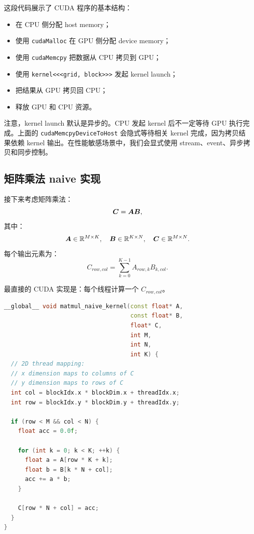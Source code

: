 这段代码展示了 CUDA 程序的基本结构：

\begin{itemize}
  \item 在 CPU 侧分配 host memory；
  \item 使用 \texttt{cudaMalloc} 在 GPU 侧分配 device memory；
  \item 使用 \texttt{cudaMemcpy} 把数据从 CPU 拷贝到 GPU；
  \item 使用 \texttt{kernel<<<grid, block>>>} 发起 kernel launch；
  \item 把结果从 GPU 拷贝回 CPU；
  \item 释放 GPU 和 CPU 资源。
\end{itemize}

注意，kernel launch 默认是异步的。CPU 发起 kernel 后不一定等待 GPU 执行完成。上面的 \texttt{cudaMemcpyDeviceToHost} 会隐式等待相关 kernel 完成，因为拷贝结果依赖 kernel 输出。在性能敏感场景中，我们会显式使用 stream、event、异步拷贝和同步控制。

\subsection{矩阵乘法 naive 实现}
\label{subsec:naive-matmul}

接下来考虑矩阵乘法：
\[
  \bm{C}=\bm{A}\bm{B},
\]
其中：
\[
  \bm{A}\in\mathbb{R}^{M\times K},
  \quad
  \bm{B}\in\mathbb{R}^{K\times N},
  \quad
  \bm{C}\in\mathbb{R}^{M\times N}.
\]
每个输出元素为：
\[
  C_{row,col}
  =
  \sum_{k=0}^{K-1}A_{row,k}B_{k,col}.
\]

最直接的 CUDA 实现是：每个线程计算一个 $C_{row,col}$。

\begin{lstlisting}[language=C++,caption={Naive CUDA 矩阵乘法 Kernel},label={lst:cuda-naive-matmul}]
__global__ void matmul_naive_kernel(const float* A,
                                    const float* B,
                                    float* C,
                                    int M,
                                    int N,
                                    int K) {
  // 2D thread mapping:
  // x dimension maps to columns of C
  // y dimension maps to rows of C
  int col = blockIdx.x * blockDim.x + threadIdx.x;
  int row = blockIdx.y * blockDim.y + threadIdx.y;

  if (row < M && col < N) {
    float acc = 0.0f;

    for (int k = 0; k < K; ++k) {
      float a = A[row * K + k];
      float b = B[k * N + col];
      acc += a * b;
    }

    C[row * N + col] = acc;
  }
}
\end{lstlisting}

